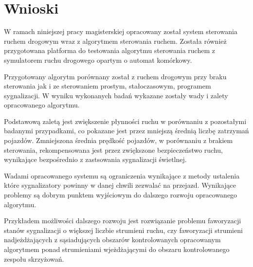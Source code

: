 \chapter{Wnioski}
W ramach niniejszej pracy magisterskiej opracowany został system sterowania ruchem drogowym wraz z algorytmem sterowania ruchem. Została również przygotowana platforma do testowania algorytmu sterowania ruchem z symulatorem ruchu drogowego opartym o automat komórkowy.

Przygotowany algorytm porównany został z ruchem drogowym przy braku sterowania jak i ze sterowaniem prostym, stałoczasowym, programem sygnalizacji. W wyniku wykonanych badań wykazane zostały wady i zalety opracowanego algorytmu.

Podstawową zaletą jest zwiększenie płynności ruchu w porównaniu z pozostałymi badanymi przypadkami, co pokazane jest przez mniejszą średnią liczbę zatrzymań pojazdów. Zmniejszona średnia prędkość pojazdów, w porównaniu z brakiem sterowania, rekompensowana jest przez zwiększone bezpieczeństwo ruchu, wynikające bezpośrednio z zastsowania sygnalizacji świetlnej.

Wadami opracowanego systemu są ograniczenia wynikające z metody ustalenia które sygnalizatory powinny w danej chwili zezwalać na przejazd. Wynikające problemy są dobrym punktem wyjściowym do dalszego rozwoju opracowanego algorytmu.

Przykładem możliwości dalszego rozwoju jest rozwiązanie problemu faworyzacji stanów sygnalizacji o większej liczbie strumieni ruchu, czy faworyzacji strumieni nadjeżdżających z sąsiadujących obszarów kontrolowanych opracowanym algorytmem ponad strumieniami wjeżdżającymi do obszaru kontrolowanego zespołu skrzyżowań.